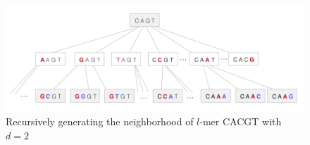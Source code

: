 \begin{figure}[h]
	\centering
	\includegraphics[width=5in]{contents/00_images/neighborhood-generation}\vspace*{5pt}
	\caption{Recursively generating the neighborhood of $l$-mer CACGT with $d = 2$}
	\label{fig:neighborhood-generation}
\end{figure}
